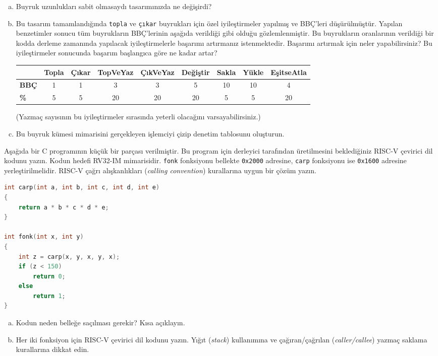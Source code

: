 \begin{alistirma}[\zor]
\begin{enumerate}[(a)]
\begin{enumerate}[(i)]
    \end{enumerate}
    \item Buyruk uzunlukları sabit olmasaydı tasarımınızda ne değişirdi?
    \item Bu tasarım tamamlandığında \texttt{topla} ve \texttt{çıkar} buyrukları için özel iyileştirmeler yapılmış ve BBÇ'leri düşürülmüştür. Yapılan benzetimler sonucu tüm buyrukların BBÇ'lerinin aşağıda verildiği gibi olduğu gözlemlenmiştir. Bu buyrukların oranlarının verildiği bir kodda derleme zamanında yapılacak iyileştirmelerle başarımı artırmanız istenmektedir. Başarımı artırmak için neler yapabilirsiniz? Bu iyileştirmeler sonucunda başarım başlangıca göre ne kadar artar?

    \begin{center}
    \footnotesize
    \begin{tabular}{|l|c|c|c|c|c|c|c|c|}
    \hline
     & \textbf{Topla} & \textbf{Çıkar} & \textbf{TopVeYaz} & \textbf{ÇıkVeYaz} & \textbf{Değiştir} & \textbf{Sakla} & \textbf{Yükle} & \textbf{EşitseAtla} \\ \hline
    \textbf{BBÇ} & 1 & 1 & 3 & 3 & 5 & 10 & 10 & 4 \\ \hline
    \textbf{\%} & 5 & 5 & 20 & 20 & 20 & 5 & 5 & 20 \\ \hline
    \end{tabular}
    \normalsize
    \end{center}

    (Yazmaç sayısının bu iyileştirmeler sırasında yeterli olacağını varsayabilirsiniz.)
    \item Bu buyruk kümesi mimarisini gerçekleyen işlemciyi çizip denetim tablosunu oluşturun.
\end{enumerate}
\end{alistirma}

\begin{alistirma}[\zor]
Aşağıda bir C programının küçük bir parçası verilmiştir. Bu program için derleyici tarafından üretilmesini beklediğiniz RISC-V çevirici dil kodunu yazın. Kodun hedefi RV32-IM mimarisidir. \texttt{fonk} fonksiyonu bellekte \texttt{0x2000} adresine, \texttt{carp} fonksiyonu ise \texttt{0x1600} adresine yerleştirilmelidir. RISC-V çağrı alışkanlıkları (\emph{calling convention}) kurallarına uygun bir çözüm yazın.

\begin{lstlisting}[language=C, style=alistirma-kod]
int carp(int a, int b, int c, int d, int e)
{
    return a * b * c * d * e;
}

int fonk(int x, int y)
{
    int z = carp(x, y, x, y, x);
    if (z < 150)
        return 0;
    else
        return 1;
}
\end{lstlisting}

\begin{enumerate}[(a)]
    \item Kodun neden belleğe saçılması gerekir? Kısa açıklayın.
    \item Her iki fonksiyon için RISC-V çevirici dil kodunu yazın. Yığıt (\emph{stack}) kullanımına ve çağıran/çağrılan (\emph{caller/callee}) yazmaç saklama kurallarına dikkat edin.
\end{enumerate}
\end{alistirma}
